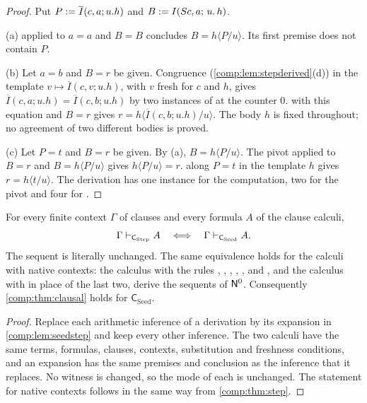 \begin{proof}
Put $P\mathrel{:=}\overline{I}(c,a;u.h)$ and $B\mathrel{:=}I(S c,a;\,u.\,h)$.

(a)  applied to $a=a$ and $B=B$ concludes
$B=h\langle P/u\rangle$. Its first premise does not contain $P$.

(b) Let $a=b$ and $B=r$ be given. Congruence
(\cref{comp:lem:stepderived}(d)) in the template
$v\mapsto\overline{I}(c,v;u.h)$, with $v$ fresh for $c$ and $h$, gives
$\overline{I}(c,a;u.h)=\overline{I}(c,b;u.h)$ by two instances of
 at the counter $0$.  with this equation and
$B=r$ gives $r=h\langle\overline{I}(c,b;u.h)/u\rangle$. The body $h$ is
fixed throughout; no agreement of two different bodies is proved.

(c) Let $P=t$ and $B=r$ be given. By (a), $B=h\langle P/u\rangle$. The pivot
applied to $B=r$ and $B=h\langle P/u\rangle$ gives $h\langle P/u\rangle=r$.
 along $P=t$ in the template $h$ gives
$r=h\langle t/u\rangle$. The derivation has one instance for the
computation, two for the pivot and four for .
\end{proof}

\begin{theorem}
\label{comp:thm:seedeval}
For every finite context $\Gamma$ of clauses and every formula $A$ of the
clause calculi,
\[
 \Gamma\vdash_{\mathsf{C}_{\mathrm{Step}}}A
 \quad\Longleftrightarrow\quad
 \Gamma\vdash_{\mathsf{C}_{\mathrm{Seed}}}A .
\]
The sequent is literally unchanged. The same equivalence holds for the
calculi with native contexts: the calculus with the rules ,
, , , ,
 and , and the calculus with  in
place of the last two, derive the sequents of $\mathsf{N}^{0}$. Consequently
\cref{comp:thm:clausal} holds for
$\mathsf{C}_{\mathrm{Seed}}$.
\end{theorem}

\begin{proof}
Replace each arithmetic inference of a derivation by its expansion in
\cref{comp:lem:seedstep} and keep every other inference. The two calculi
have the same terms, formulas, clauses, contexts, substitution and freshness
conditions, and an expansion has the same premises and conclusion as the
inference that it replaces. No witness is changed, so the mode of each
 is unchanged. The statement for native contexts follows in
the same way from \cref{comp:thm:step}.
\end{proof}

